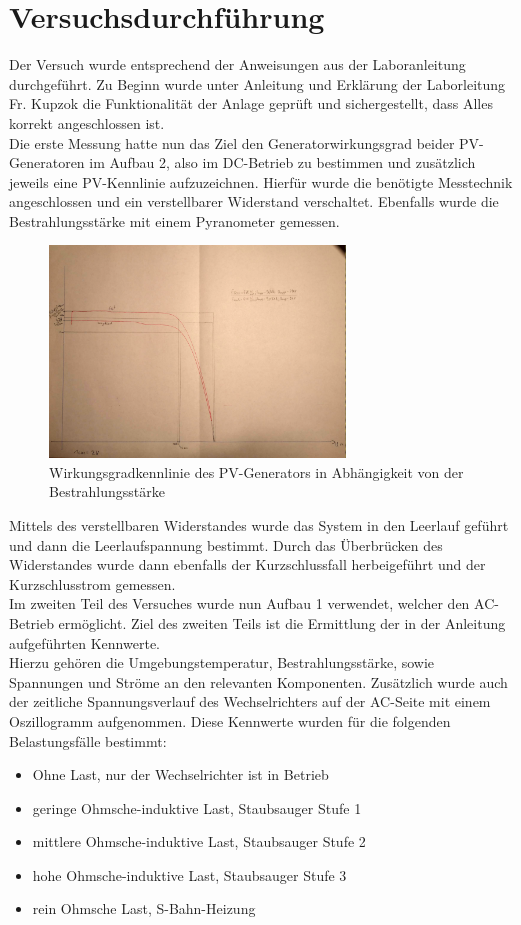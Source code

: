 \section{Versuchsdurchführung}
Der Versuch wurde entsprechend der Anweisungen aus der Laboranleitung \cite{Laboranleitung} durchgeführt.
Zu Beginn wurde unter Anleitung und Erklärung der Laborleitung Fr. Kupzok die
Funktionalität der Anlage geprüft und sichergestellt, dass Alles korrekt angeschlossen ist.\\
Die erste Messung hatte nun das Ziel den Generatorwirkungsgrad beider PV-Generatoren im Aufbau 2, also im DC-Betrieb zu bestimmen
und zusätzlich jeweils eine PV-Kennlinie aufzuzeichnen. Hierfür wurde die benötigte Messtechnik angeschlossen und ein verstellbarer Widerstand verschaltet.
Ebenfalls wurde die Bestrahlungsstärke mit einem Pyranometer gemessen.\\
\begin{figure}[!ht]
		\centering
		\includegraphics[width=0.7\textwidth]{Abbildungen/Kennlinie_PVGEN}
		\caption{Wirkungsgradkennlinie des PV-Generators in Abhängigkeit von der Bestrahlungsstärke}
		\label{fig:230514_PVGEN_Kennlinie}
\end{figure}

Mittels des verstellbaren Widerstandes wurde das System in den Leerlauf geführt und dann die Leerlaufspannung bestimmt.
Durch das Überbrücken des Widerstandes wurde dann ebenfalls der Kurzschlussfall herbeigeführt und der Kurzschlusstrom gemessen.\\
Im zweiten Teil des Versuches wurde nun Aufbau 1 verwendet, welcher den AC-Betrieb ermöglicht.
Ziel des zweiten Teils ist die Ermittlung der in der Anleitung \cite[S.8]{Laboranleitung} aufgeführten Kennwerte.\\
Hierzu gehören die Umgebungstemperatur, Bestrahlungsstärke, sowie Spannungen und Ströme an den relevanten Komponenten.
Zusätzlich wurde auch der zeitliche Spannungsverlauf des Wechselrichters auf der AC-Seite mit einem Oszillogramm aufgenommen.
Diese Kennwerte wurden für die folgenden Belastungsfälle bestimmt:
\begin{itemize}
    \item Ohne Last, nur der Wechselrichter ist in Betrieb
    \item geringe Ohmsche-induktive Last, Staubsauger Stufe 1
    \item mittlere Ohmsche-induktive Last, Staubsauger Stufe 2
    \item hohe Ohmsche-induktive Last, Staubsauger Stufe 3
    \item rein Ohmsche Last, S-Bahn-Heizung
\end{itemize}